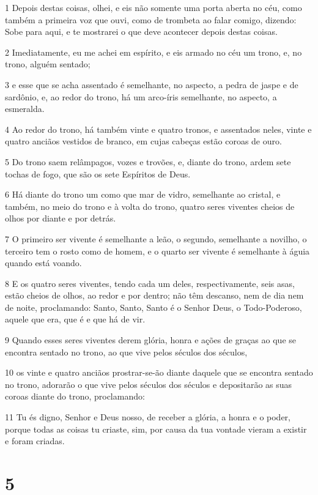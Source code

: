 \par 1 Depois destas coisas, olhei, e eis não somente uma porta aberta no céu, como também a primeira voz que ouvi, como de trombeta ao falar comigo, dizendo: Sobe para aqui, e te mostrarei o que deve acontecer depois destas coisas.
\par 2 Imediatamente, eu me achei em espírito, e eis armado no céu um trono, e, no trono, alguém sentado;
\par 3 e esse que se acha assentado é semelhante, no aspecto, a pedra de jaspe e de sardônio, e, ao redor do trono, há um arco-íris semelhante, no aspecto, a esmeralda.
\par 4 Ao redor do trono, há também vinte e quatro tronos, e assentados neles, vinte e quatro anciãos vestidos de branco, em cujas cabeças estão coroas de ouro.
\par 5 Do trono saem relâmpagos, vozes e trovões, e, diante do trono, ardem sete tochas de fogo, que são os sete Espíritos de Deus.
\par 6 Há diante do trono um como que mar de vidro, semelhante ao cristal, e também, no meio do trono e à volta do trono, quatro seres viventes cheios de olhos por diante e por detrás.
\par 7 O primeiro ser vivente é semelhante a leão, o segundo, semelhante a novilho, o terceiro tem o rosto como de homem, e o quarto ser vivente é semelhante à águia quando está voando.
\par 8 E os quatro seres viventes, tendo cada um deles, respectivamente, seis asas, estão cheios de olhos, ao redor e por dentro; não têm descanso, nem de dia nem de noite, proclamando: Santo, Santo, Santo é o Senhor Deus, o Todo-Poderoso, aquele que era, que é e que há de vir.
\par 9 Quando esses seres viventes derem glória, honra e ações de graças ao que se encontra sentado no trono, ao que vive pelos séculos dos séculos,
\par 10 os vinte e quatro anciãos prostrar-se-ão diante daquele que se encontra sentado no trono, adorarão o que vive pelos séculos dos séculos e depositarão as suas coroas diante do trono, proclamando:
\par 11 Tu és digno, Senhor e Deus nosso, de receber a glória, a honra e o poder, porque todas as coisas tu criaste, sim, por causa da tua vontade vieram a existir e foram criadas.

\chapter{5}

